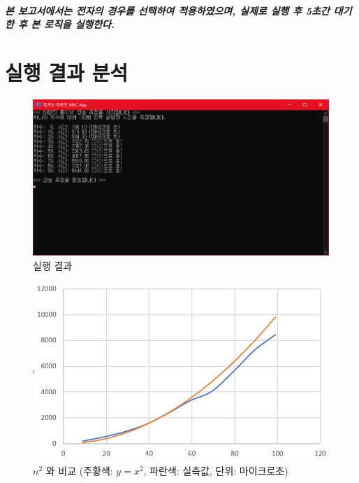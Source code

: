 \documentclass[UTF8]{report}
\begin{document}
            \paragraph{%
                \normalfont 본 보고서에서는 전자의 경우를 선택하여 적용하였으며, 실제로 실행 후 5초간 대기한 후 본 로직을 실행한다. 
            }

    \chapter{실행 결과 분석}
        \begin{figure}[h]
            \centering
            \includegraphics[width=\textwidth]{test_result.png}
            \caption{실행 결과}
            \label{fig:result}
        \end{figure}
        
        \begin{figure}[h]
            \centering
            \includegraphics[width=\textwidth]{chart.PNG}
            \caption{$n^2$ 와 비교 (주황색: $y=x^2$, 파란색: 실측값, 단위: 마이크로초)}
            \label{fig:comparison}
        \end{figure}
        
\end{document}

